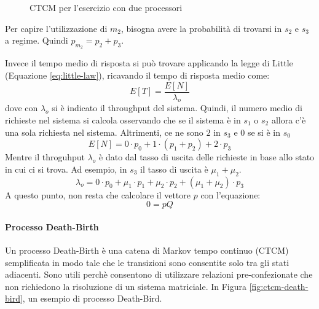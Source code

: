 \documentclass{article}
\begin{document}
\begin{figure}
  \centering
  \caption{CTCM per l'esercizio con due processori}
  \label{fig:ctcm-4state-ex}
\end{figure}

Per capire l'utilizzazione di $m_2$, bisogna avere la probabilità di trovarsi in $s_2$ e 
$s_3$ a regime. Quindi $p_{m_2} = p_2 + p_3$. 

Invece il tempo medio di risposta si può trovare applicando la legge di Little (Equazione
\ref{eq:little-law}), ricavando il tempo di risposta medio come:
\[
  E[T] = \frac{E[N]}{\lambda_o}
\]
dove con $\lambda_o$ si è indicato il throughput del sistema.
Quindi, il numero medio di richieste nel sistema si calcola osservando che se il sistema è 
in $s_1$ o $s_2$ allora c'è una sola richiesta nel sistema. Altrimenti, ce ne sono $2$ in
$s_3$ e $0$ se si è in $s_0$
\[
  E[N] = 0\cdot p_0 + 1 \cdot (p_1 + p_2) + 2 \cdot p_3
\]
Mentre il throguhput $\lambda_o$ è dato dal tasso di uscita delle richieste in base allo 
stato in cui ci si trova. Ad esempio, in $s_3$ il tasso di uscita è $\mu_1 + \mu_2$. 
\[
  \lambda_o = 0\cdot p_0 + \mu_1 \cdot p_1 + \mu_2 \cdot p_2 + (\mu_1+\mu_2) \cdot p_3
\]
A questo punto, non resta che calcolare il vettore $p$ con l'equazione:
\[
  0 = pQ
\]
\paragraph{Processo Death-Birth}
Un processo Death-Birth è una catena di Markov tempo continuo (CTCM) semplificata in modo 
tale che le transizioni sono consentite solo tra gli stati adiacenti. Sono utili perchè 
consentono di utilizzare relazioni pre-confezionate che non richiedono la risoluzione di 
un sistema matriciale. In Figura \ref{fig:ctcm-death-bird}, un esempio di processo
Death-Bird. 
\end{document}

